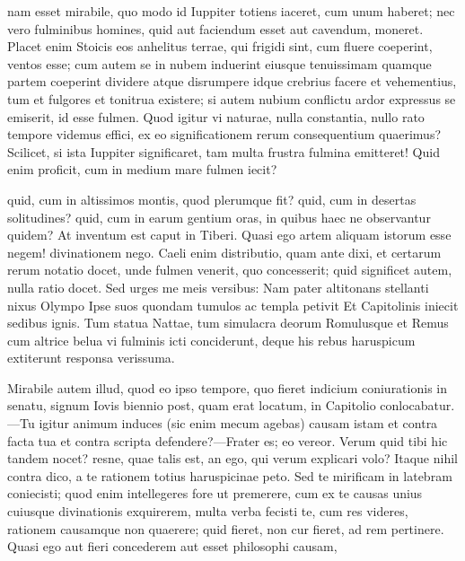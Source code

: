  nam esset mirabile, quo modo id Iuppiter totiens iaceret, cum unum haberet; nec vero fulminibus homines, quid aut faciendum esset aut cavendum, moneret. Placet enim Stoicis eos anhelitus terrae, qui frigidi sint, cum fluere coeperint, ventos esse; cum autem se in nubem induerint eiusque tenuissimam quamque partem coeperint dividere atque disrumpere idque crebrius facere et vehementius, tum et fulgores et tonitrua existere; si autem nubium conflictu ardor expressus se emiserit, id esse fulmen. Quod igitur vi naturae, nulla constantia, nullo rato tempore videmus effici, ex eo significationem rerum consequentium quaerimus? Scilicet, si ista Iuppiter significaret, tam multa frustra fulmina emitteret! Quid enim proficit, cum in medium mare fulmen iecit?

 quid, cum in altissimos montis, quod plerumque fit? quid, cum in desertas solitudines? quid, cum in earum gentium oras, in quibus haec ne observantur quidem? At inventum est caput in Tiberi. Quasi ego artem aliquam istorum esse negem! divinationem nego. Caeli enim distributio, quam ante dixi, et certarum rerum notatio docet, unde fulmen venerit, quo concesserit; quid significet autem, nulla ratio docet. Sed urges me meis versibus: Nam pater altitonans stellanti nixus Olympo Ipse suos quondam tumulos ac templa petivit Et Capitolinis iniecit sedibus ignis. Tum statua Nattae, tum simulacra deorum Romulusque et Remus cum altrice belua vi fulminis icti conciderunt, deque his rebus haruspicum extiterunt responsa verissuma.

 Mirabile autem illud, quod eo ipso tempore, quo fieret indicium coniurationis in senatu, signum Iovis biennio post, quam erat locatum, in Capitolio conlocabatur.—Tu igitur animum induces (sic enim mecum agebas) causam istam et contra facta tua et contra scripta defendere?—Frater es; eo vereor. Verum quid tibi hic tandem nocet? resne, quae talis est, an ego, qui verum explicari volo? Itaque nihil contra dico, a te rationem totius haruspicinae peto. Sed te mirificam in latebram coniecisti; quod enim intellegeres fore ut premerere, cum ex te causas unius cuiusque divinationis exquirerem, multa verba fecisti te, cum res videres, rationem causamque non quaerere; quid fieret, non cur fieret, ad rem pertinere. Quasi ego aut fieri concederem aut esset philosophi causam,

